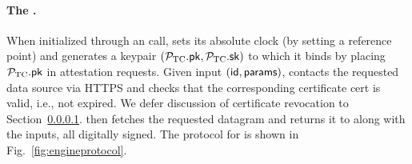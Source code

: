 \paragraph{The \encname \engine.} When initialized through an \initcall call, \engine sets its absolute clock (by setting a reference point) and generates a keypair $({\mathcal{P}}_{\textrm{TC}}.{\sf pk},{\mathcal{P}}_{\textrm{TC}}.{\sf sk})$ to which it binds by placing ${\mathcal{P}}_{\textrm{TC}}.{\sf pk}$ in attestation requests. Given input \resumecall $({\sf id}, {\sf params})$, \engine contacts the requested data source via HTTPS and checks that the corresponding certificate {\sf cert} is valid, i.e., not expired. We defer discussion of certificate revocation to Section~\ref{}. \engine then fetches the requested datagram and returns it to \relay along with the inputs, all digitally signed. The protocol for \engine is shown in Fig.~\ref{fig:engineprotocol}.

